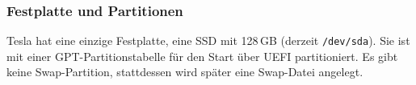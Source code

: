 \subsubsection{Festplatte und Partitionen}
\label{tesla-partitionen}
Tesla hat eine einzige Festplatte, eine SSD mit 128\,GB (derzeit \texttt{/dev/sda}). Sie ist mit einer GPT-Partitionstabelle für den Start über UEFI partitioniert. Es gibt keine Swap-Partition, stattdessen wird später eine Swap-Datei angelegt.

\begin{config}
\end{config}

\begin{config}
\end{config}
